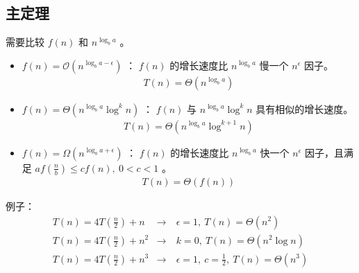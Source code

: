 \documentclass[letterpaper,10pt,english]{sphinxmanual}
\begin{document}
\subsection{主定理}
\label{\detokenize{mathematicsAlgorithm/01_complexity:id3}}
需要比较 \(f(n)\) 和 \(n^{\log_b a}\) 。
\begin{itemize}
\item {} 
\(f(n) = \mathcal{O}(n^{\log_b a - \epsilon})\) ： \(f(n)\) 的增长速度比 \(n^{\log_b a}\) 慢一个 \(n^{\epsilon}\) 因子。
\begin{equation*}
\begin{split}T(n) = \Theta (n^{\log_b a})\end{split}
\end{equation*}
\item {} 
\(f(n) = \Theta (n^{\log_b a} \log^k n)\) ： \(f(n)\) 与 \(n^{\log_b a} \log^k n\) 具有相似的增长速度。
\begin{equation*}
\begin{split}T(n) = \Theta (n^{\log_b a} \log^{k+1} n)\end{split}
\end{equation*}
\item {} 
\(f(n) = \Omega (n^{\log_b a + \epsilon})\) ： \(f(n)\) 的增长速度比 \(n^{\log_b a}\) 快一个 \(n^{\epsilon}\) 因子，且满足 \(af(\frac{n}{b}) \leqslant cf(n),\ 0 < c < 1\) 。
\begin{equation*}
\begin{split}T(n) = \Theta (f(n))\end{split}
\end{equation*}
\end{itemize}

例子：
\begin{equation*}
\begin{split}T(n) = 4T(\frac{n}{2}) + n & \rightarrow &\ \epsilon = 1,\ T(n) = \Theta (n^2) \\
T(n) = 4T(\frac{n}{2}) + n^2 & \rightarrow &\ k=0,\ T(n) = \Theta (n^2 \log n) \\
T(n) = 4T(\frac{n}{2}) + n^3 & \rightarrow &\ \epsilon = 1,\ c=\frac{1}{2},\ T(n) = \Theta (n^3)\end{split}
\end{equation*}
\end{document}
